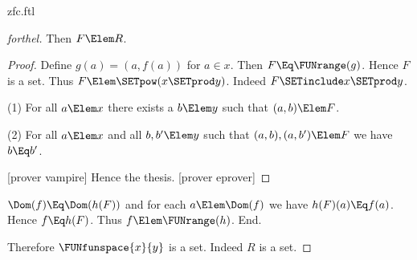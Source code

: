\documentclass{stex}
\begin{document}
\begin{smodule}{zfc.ftl}
\begin{proof}[forthel]
    Then $F \Elem R$.
    \begin{proof}
      Define $g(a) = (a,f(a))$ for $a \in x$.
      Then $F \Eq \FUNrange(g)$.
      Hence $F$ is a set.
      Thus $F \Elem \SETpow(x \SETprod y)$.
      Indeed $F \SETinclude x \SETprod y$.

      (1) For all $a \Elem x$ there exists a $b \Elem y$ such that $(a,b) \Elem F$.

      (2) For all $a \Elem x$ and all $b, b' \Elem y$ such that $(a,b),
      (a,b') \Elem F$ we have $b \Eq b'$.

      [prover vampire]
      Hence the thesis.
      [prover eprover]
    \end{proof}

    $\Dom(f) \Eq \Dom(h(F))$ and for each $a \Elem \Dom(f)$ we have $h(F)(a) \Eq f(a)$.
    Hence $f \Eq h(F)$.
    Thus $f \Elem \FUNrange(h)$.
  End.

  Therefore $\FUNfunspace{x}{y}$ is a set.
  Indeed $R$ is a set.
\end{proof}
\end{smodule}
\end{document}

